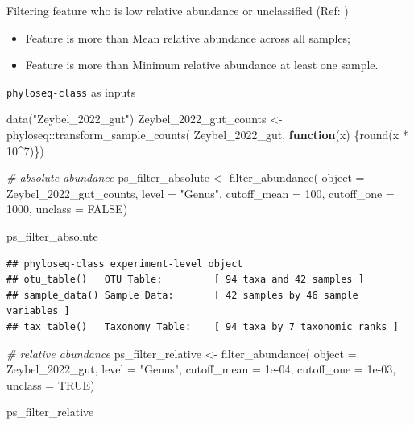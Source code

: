 \documentclass[
]{book}
\newenvironment{Shaded}{\begin{snugshade}}{\end{snugshade}}
\newcommand{\AttributeTok}[1]{\textcolor[rgb]{0.77,0.63,0.00}{#1}}
\newcommand{\CommentTok}[1]{\textcolor[rgb]{0.56,0.35,0.01}{\textit{#1}}}
\newcommand{\ConstantTok}[1]{\textcolor[rgb]{0.00,0.00,0.00}{#1}}
\newcommand{\ControlFlowTok}[1]{\textcolor[rgb]{0.13,0.29,0.53}{\textbf{#1}}}
\newcommand{\DecValTok}[1]{\textcolor[rgb]{0.00,0.00,0.81}{#1}}
\newcommand{\FloatTok}[1]{\textcolor[rgb]{0.00,0.00,0.81}{#1}}
\newcommand{\FunctionTok}[1]{\textcolor[rgb]{0.00,0.00,0.00}{#1}}
\newcommand{\NormalTok}[1]{#1}
\newcommand{\OtherTok}[1]{\textcolor[rgb]{0.56,0.35,0.01}{#1}}
\newcommand{\SpecialCharTok}[1]{\textcolor[rgb]{0.00,0.00,0.00}{#1}}
\newcommand{\StringTok}[1]{\textcolor[rgb]{0.31,0.60,0.02}{#1}}
\begin{document}
Filtering feature who is low relative abundance or unclassified (Ref: \citep{thingholm2019obese})

\begin{itemize}
\item
  Feature is more than Mean relative abundance across all samples;
\item
  Feature is more than Minimum relative abundance at least one sample.
\end{itemize}

\texttt{phyloseq-class} as inputs

\begin{Shaded}
\begin{Highlighting}[]
\FunctionTok{data}\NormalTok{(}\StringTok{"Zeybel\_2022\_gut"}\NormalTok{)}
\NormalTok{Zeybel\_2022\_gut\_counts }\OtherTok{\textless{}{-}}\NormalTok{ phyloseq}\SpecialCharTok{::}\FunctionTok{transform\_sample\_counts}\NormalTok{(}
\NormalTok{Zeybel\_2022\_gut, }\ControlFlowTok{function}\NormalTok{(x) \{}\FunctionTok{round}\NormalTok{(x }\SpecialCharTok{*} \DecValTok{10}\SpecialCharTok{\^{}}\DecValTok{7}\NormalTok{)\})}

\CommentTok{\# absolute abundance}
\NormalTok{ps\_filter\_absolute }\OtherTok{\textless{}{-}} \FunctionTok{filter\_abundance}\NormalTok{(}
   \AttributeTok{object =}\NormalTok{ Zeybel\_2022\_gut\_counts,}
   \AttributeTok{level =} \StringTok{"Genus"}\NormalTok{,}
   \AttributeTok{cutoff\_mean =} \DecValTok{100}\NormalTok{,}
   \AttributeTok{cutoff\_one =} \DecValTok{1000}\NormalTok{,}
   \AttributeTok{unclass =} \ConstantTok{FALSE}\NormalTok{)}

\NormalTok{ps\_filter\_absolute}
\end{Highlighting}
\end{Shaded}

\begin{verbatim}
## phyloseq-class experiment-level object
## otu_table()   OTU Table:         [ 94 taxa and 42 samples ]
## sample_data() Sample Data:       [ 42 samples by 46 sample variables ]
## tax_table()   Taxonomy Table:    [ 94 taxa by 7 taxonomic ranks ]
\end{verbatim}

\begin{Shaded}
\begin{Highlighting}[]
\CommentTok{\# relative abundance}
\NormalTok{ps\_filter\_relative }\OtherTok{\textless{}{-}} \FunctionTok{filter\_abundance}\NormalTok{(}
   \AttributeTok{object =}\NormalTok{ Zeybel\_2022\_gut,}
   \AttributeTok{level =} \StringTok{"Genus"}\NormalTok{,}
   \AttributeTok{cutoff\_mean =} \FloatTok{1e{-}04}\NormalTok{,}
   \AttributeTok{cutoff\_one =} \FloatTok{1e{-}03}\NormalTok{,}
   \AttributeTok{unclass =} \ConstantTok{TRUE}\NormalTok{)}

\NormalTok{ps\_filter\_relative}
\end{Highlighting}
\end{Shaded}
\end{document}
